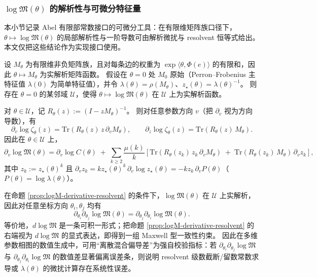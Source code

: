 \subsubsection{\texorpdfstring{$\log\mathfrak{M}(\theta)$}{logM(theta)} 的解析性与可微分特征量}\label{subsec:logM-analyticity}
本小节记录 Abel 有限部常数接口的可微分工具：在有限维矩阵族口径下，$\theta\mapsto\log\mathfrak{M}(\theta)$ 的局部解析性与一阶导数可由解析微扰与 resolvent 恒等式给出。本文仅把这些结论作为实现接口使用。

\begin{remark}\label{prop:logM-analytic}
设 $M_\theta$ 为有限维非负矩阵族，且对每条边的权重为 $\exp\langle\theta,\Phi(e)\rangle$ 的有限和，因此 $\theta\mapsto M_\theta$ 为实解析矩阵函数。
假设在 $\theta=0$ 处 $M_0$ 原始（Perron--Frobenius 主特征值 $\lambda(0)$ 为简单特征值），并令 $\lambda(\theta)=\rho(M_\theta)$、$z_\star(\theta)=\lambda(\theta)^{-1}$。
则存在 $\theta=0$ 的某邻域 $\mathcal{U}$，使得 $\theta\mapsto\log\mathfrak{M}(\theta)$ 在 $\mathcal{U}$ 上为实解析函数。
\end{remark}

\begin{remark}\label{prop:logM-derivative-resolvent}
对 $\theta\in\mathcal{U}$，记 $R_\theta(z):=(I-zM_\theta)^{-1}$。
则对任意参数方向 $v$（把 $\partial_v$ 视为方向导数），有
\[
\partial_v\log\zeta_\theta(z)=\mathrm{Tr}\!\left(R_\theta(z)\,z\,\partial_v M_\theta\right),
\qquad
\partial_z\log\zeta_\theta(z)=\mathrm{Tr}\!\left(R_\theta(z)\,M_\theta\right).
\]
因此在 $\theta\in\mathcal{U}$ 上，
\[
\partial_v\log\mathfrak{M}(\theta)
=
\partial_v\log C(\theta)
\;+\;
\sum_{k\ge 2}\frac{\mu(k)}{k}\left[
\mathrm{Tr}\!\left(R_\theta(z_k)\,z_k\,\partial_v M_\theta\right)
\;+\;
\mathrm{Tr}\!\left(R_\theta(z_k)\,M_\theta\right)\,\partial_v z_k
\right],
\]
其中 $z_k:=z_\star(\theta)^k$ 且 $\partial_v z_k = k z_\star(\theta)^k\,\partial_v\log z_\star(\theta)=-k z_k\,\partial_v P(\theta)$（$P(\theta)=\log\lambda(\theta)$）。
\end{remark}

\begin{remark}\label{cor:logM-maxwell}
在命题 \ref{prop:logM-derivative-resolvent} 的条件下，$\log\mathfrak{M}(\theta)$ 在 $\mathcal{U}$ 上实解析，
因此对任意坐标方向 $\theta_i,\theta_j$ 均有
\[
\partial_{\theta_i}\partial_{\theta_j}\log\mathfrak{M}(\theta)=\partial_{\theta_j}\partial_{\theta_i}\log\mathfrak{M}(\theta).
\]
等价地，$d\log\mathfrak{M}$ 是一条可积一形式；把命题 \ref{prop:logM-derivative-resolvent} 的右端视为 $d\log\mathfrak{M}$ 的显式表达，即得到一组 Maxwell 型一致性约束。
因此在多维参数相图的数值生成中，可用“离散混合偏导差”为强自校验指标：若
\(
\partial_{\theta_i}\partial_{\theta_j}\log\mathfrak{M}
\)
与
\(
\partial_{\theta_j}\partial_{\theta_i}\log\mathfrak{M}
\)
的数值差显著偏离误差条，则说明 resolvent 级数截断/留数常数求导或 $\lambda(\theta)$ 的微扰计算存在系统性误差。
\end{remark}


